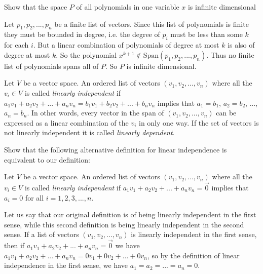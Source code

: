 \begin{Basis and Dimension}
 	Show that the space $P$ of all polynomials in one variable $x$ is infinite dimensional

\begin{free-response}
	 Let $p_1,p_2,...,p_n$ be a finite list of  vectors.  
	Since this list of polynomials is finite they must be bounded in degree, i.e.  the degree of $p_i$ must be less than some $k$ for each $i$.  But a linear combination
	of polynomials of degree at most $k$ is also of degree at most $k$.  So the polynomial $x^{k+1} \not\in  \textrm{Span}(p_1,p_2,...,p_n)$. Thus no finite list of 
	polynomials spans all of $P$.  So $P$ is infinite dimensional.
\end{free-response}

 \begin{definition}
 	Let $V$ be a vector space. An ordered list of vectors $(v_1,v_2,...,v_n)$ where all the $v_i \in V$ is called \textit{linearly independent} if
 	$a_1v_1+a_2v_2 + ...+a_nv_n = b_1v_1 + b_2v_2 + ... + b_nv_n$ implies that $a_1  = b_1$, $a_2 = b_2$, ...,$a_n=b_n$.  In other words,
 	every vector in the span of $(v_1,v_2,...,v_n)$ can be expressed as a linear combination of the $v_i$ in only one way.  
 	If the set of vectors is not linearly independent it is called \textit{linearly dependent}.
 \end{definition}
 
 
 	Show that the following alternative definition for linear independence is equivalent to our definition:
 	
 	\begin{definition}
 		Let $V$ be a vector space. An ordered list of vectors $(v_1,v_2,...,v_n)$ where all the $v_i \in V$ is called \textit{linearly independent} if
 	$a_1v_1+a_2v_2 + ...+a_nv_n = \vec{0}$ implies that $a_i = 0 $ for all $i=1,2,3,...,n$.
 	\end{definition}
 	
 
 \begin{free-response}
	Let us say that our original definition is of  being linearly independent in the first sense, while this second definition is being linearly independent 
	in the second sense.  If a list of vectors $(v_1,v_2,...,v_n)$ is linearly independent in the first sense, then if $a_1v_1+a_2v_2 + ...+a_nv_n = \vec{0}$ we have
	$a_1v_1+a_2v_2 + ...+a_nv_n = 0v_1+0v_2+...+0v_n$, so by the definition of linear independence in the first sense, we have $a_1=a_2=...=a_n=0$.
	

\end{free-response}
\end{Basis and Dimension}
